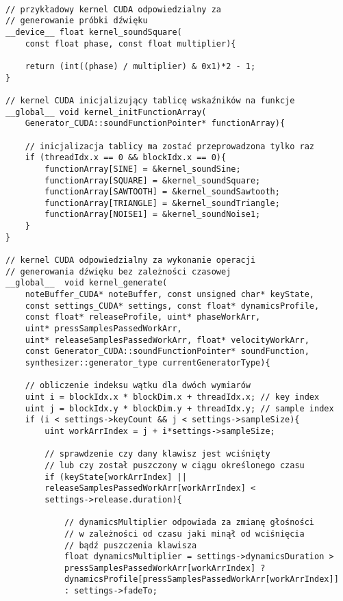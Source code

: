 \begin{lstlisting}

// przykładowy kernel CUDA odpowiedzialny za 
// generowanie próbki dźwięku
__device__ float kernel_soundSquare(
    const float phase, const float multiplier){

    return (int((phase) / multiplier) & 0x1)*2 - 1;
}

// kernel CUDA inicjalizujący tablicę wskaźników na funkcje
__global__ void kernel_initFunctionArray(
    Generator_CUDA::soundFunctionPointer* functionArray){

    // inicjalizacja tablicy ma zostać przeprowadzona tylko raz
    if (threadIdx.x == 0 && blockIdx.x == 0){
        functionArray[SINE] = &kernel_soundSine;
        functionArray[SQUARE] = &kernel_soundSquare;
        functionArray[SAWTOOTH] = &kernel_soundSawtooth;
        functionArray[TRIANGLE] = &kernel_soundTriangle;
        functionArray[NOISE1] = &kernel_soundNoise1;
    }
}

// kernel CUDA odpowiedzialny za wykonanie operacji
// generowania dźwięku bez zależności czasowej
__global__  void kernel_generate(
    noteBuffer_CUDA* noteBuffer, const unsigned char* keyState,
    const settings_CUDA* settings, const float* dynamicsProfile,
    const float* releaseProfile, uint* phaseWorkArr,
    uint* pressSamplesPassedWorkArr,
    uint* releaseSamplesPassedWorkArr, float* velocityWorkArr,
    const Generator_CUDA::soundFunctionPointer* soundFunction,
    synthesizer::generator_type currentGeneratorType){

    // obliczenie indeksu wątku dla dwóch wymiarów
    uint i = blockIdx.x * blockDim.x + threadIdx.x; // key index
    uint j = blockIdx.y * blockDim.y + threadIdx.y; // sample index
    if (i < settings->keyCount && j < settings->sampleSize){
        uint workArrIndex = j + i*settings->sampleSize;
        
        // sprawdzenie czy dany klawisz jest wciśnięty
        // lub czy został puszczony w ciągu określonego czasu
        if (keyState[workArrIndex] ||
        releaseSamplesPassedWorkArr[workArrIndex] <
        settings->release.duration){

            // dynamicsMultiplier odpowiada za zmianę głośności
            // w zależności od czasu jaki minął od wciśnięcia
            // bądź puszczenia klawisza
            float dynamicsMultiplier = settings->dynamicsDuration >
            pressSamplesPassedWorkArr[workArrIndex] ? 
            dynamicsProfile[pressSamplesPassedWorkArr[workArrIndex]]
            : settings->fadeTo;


\end{lstlisting}

